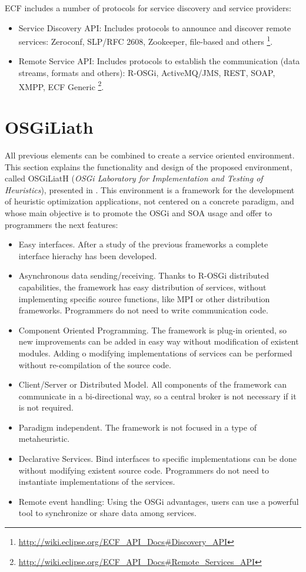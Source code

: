 \documentclass{sig-alternate}
\begin{document}
ECF includes a number of protocols for service discovery and service providers:
\begin{itemize}
\item Service Discovery API: Includes protocols to announce and discover remote services: Zeroconf, SLP/RFC 2608, Zookeeper, file-based and others \footnote{\url{http://wiki.eclipse.org/ECF_API_Docs#Discovery_API}}.
\item Remote Service API: Includes protocols to establish the communication (data streams, formats and others): R-OSGi, ActiveMQ/JMS, REST, SOAP, XMPP, ECF Generic \footnote{\url{http://wiki.eclipse.org/ECF_API_Docs#Remote_Services_API}}.
\end{itemize}

\section{OSGiLiath}
\label{sec:osgiliath}
All previous elements can be combined to create a service oriented environment. This section explains the functionality and design of the proposed environment, called OSGiLiatH ({\em OSGi Laboratory for Implementation and Testing of Heuristics}), presented in \cite{OSGILIATHNICSO}. This environment is a  framework for the development of heuristic optimization applications, not centered on a concrete paradigm, and whose main objective is to promote the OSGi and SOA usage and offer to programmers the next features:

\begin{itemize}
\item Easy interfaces. After a study of the previous frameworks a complete interface hierachy has been developed.
\item Asynchronous data sending/receiving. Thanks to R-OSGi distributed capabilities, the framework has easy distribution of services, without implementing specific source functions, like MPI or other distribution frameworks. Programmers do not need to write communication code. 
\item Component Oriented Programming. The framework is plug-in oriented, so new improvements can be added in easy way without modification of existent modules. Adding o modifying implementations of services can be performed without re-compilation of the source code.
\item Client/Server or Distributed Model. All components of the framework can communicate in a bi-directional way, so a central broker is not necessary if it is not required.
\item Paradigm independent. The framework is not focused in a type of metaheuristic.
\item Declarative Services. Bind interfaces to specific implementations can be done without modifying existent source code. Programmers do not need to instantiate implementations of the services.
\item Remote event handling: Using the OSGi advantages, users can use a powerful tool to synchronize or share data among services.
\end{itemize}
\end{document}
